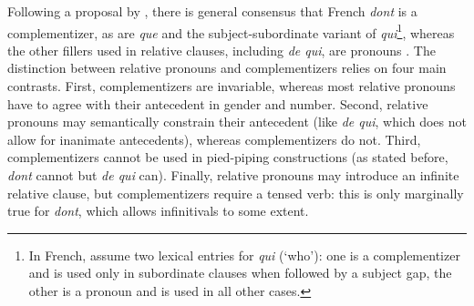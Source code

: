 \begin{exe}\ex\label{ex:intro-dequi}
    \begin{xlist}
    \label{ex:dequi-rel}
    \label{ex:dequi-freerel}
    \label{ex:dequi-qu}
    \label{ex:dequi-cleft}
    \label{ex:dequi-piedpiping}
    \end{xlist}
\end{exe}

\label{p:qui-que-are-complementizers}

Following a proposal by \citet{Godard.1988}, there is general consensus that French \emph{dont} is a complementizer, as are \emph{que} and the subject-sub\-or\-di\-nate variant of \emph{qui}\footnote{In French, \citet{Abeille.2007.Relatives} assume two lexical entries for \emph{qui} (`who'): one is a complementizer and is used only in subordinate clauses when followed by a subject gap, the other is a pronoun and is used in all other cases.}, whereas the other fillers used in relative clauses, including \emph{de qui}, are pronouns \citep{Tellier.1990,Abeille.2007.Relatives,LeGoffic.2007}. The distinction between relative pronouns and complementizers relies on four main contrasts. First, complementizers are invariable, whereas most relative pronouns have to agree with their antecedent in gender and number. Second, relative pronouns may semantically constrain their antecedent (like \emph{de qui}, which does not allow for inanimate antecedents), whereas complementizers do not. Third, complementizers cannot be used in pied-piping constructions (as stated before, \emph{dont} cannot but \emph{de qui} can). Finally, relative pronouns may introduce an infinite relative clause, but complementizers require a tensed verb: this is only marginally true for \emph{dont}, which allows infinitivals to some extent.

